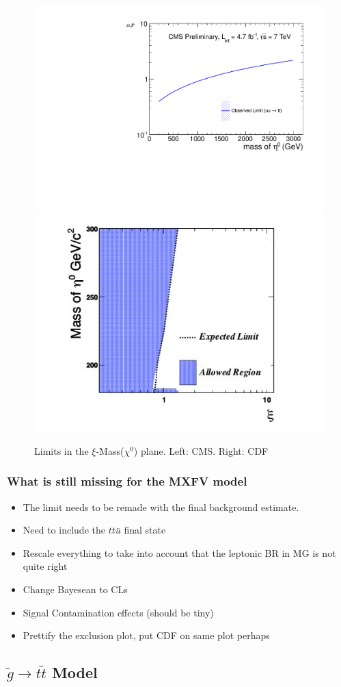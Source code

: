 \begin{figure}[htb]
\begin{center}
\includegraphics[width=0.45\linewidth]{figs/MxVExcl.pdf}
\includegraphics[width=0.45\linewidth]{figs/CDFlimit.png}
\caption{Limits in the $\xi$-Mass($\chi^0$) plane.  Left: CMS.  Right: CDF
\label{fig:MxVExcl}}
\end{center}
\end{figure}

\subsubsection{What is still missing for the MXFV model}
\begin{itemize}
\item The limit needs to be remade with the final background estimate.
\item Need to include the $tt\bar{u}$ final state
\item Rescale everything to take into account that the leptonic BR in MG is not quite right
\item Change Bayesean to CLs
\item Signal Contamination effects (should be tiny)
\item Prettify the exclusion plot, put CDF on same plot perhaps
\end{itemize}



\subsection{$\widetilde{g} \to t\widetilde{t}$ Model}
\label{firststopmodel}

